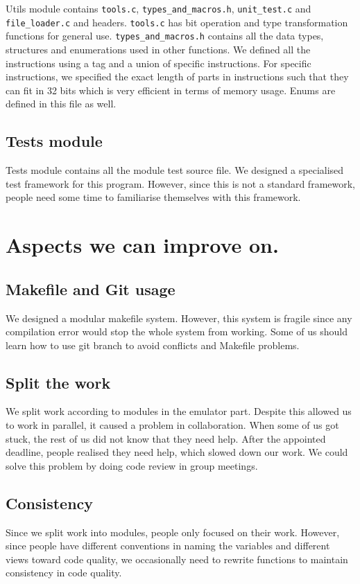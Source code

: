 \documentclass[10pt]{article}
\begin{document}
	Utils module contains \texttt{tools.c}, \texttt{types\_and\_macros.h}, \texttt{unit\_test.c} and \texttt{file\_loader.c} and headers. \texttt{tools.c} has bit operation and type transformation functions for general use. \texttt{types\_and\_macros.h} contains all the data types, structures and enumerations used in other functions. We defined all the instructions using a tag and a union of specific instructions. For specific instructions, we specified the exact length of parts in instructions such that they can fit in 32 bits which is very efficient in terms of memory usage. Enums are defined in this file as well.
	
	\subsection{Tests module}
	
	Tests module contains all the module test source file. We designed a specialised test framework for this program. However, since this is not a standard framework, people need some time to familiarise themselves with this framework.
	
	\section{Aspects we can improve on.}
	
	\subsection{Makefile and Git usage}
	
	We designed a modular makefile system. However, this system is fragile since any compilation error would stop the whole system from working. Some of us should learn how to use git branch to avoid conflicts and Makefile problems.
	
	\subsection{Split the work}
	
	We split work according to modules in the emulator part. Despite this allowed us to work in parallel, it caused a problem in collaboration. When some of us got stuck, the rest of us did not know that they need help. After the appointed deadline, people realised they need help, which slowed down our work. We could solve this problem by doing code review in group meetings.
	
	\subsection{Consistency}
	
	Since we split work into modules, people only focused on their work. However, since people have different conventions in naming the variables and different views toward code quality, we occasionally need to rewrite functions to maintain consistency in code quality.
	
\end{document}

